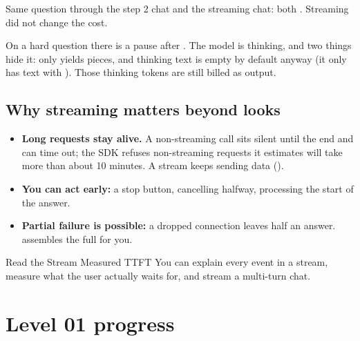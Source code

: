 \begin{lab}
Same question through the step 2 chat and the streaming chat: both . Streaming did not change the cost.
\end{lab}

\begin{trap}
On a hard question there is a pause after . The model is thinking, and two things
hide it:  only yields  pieces, and thinking text is empty by
default anyway (it only has text with ).
Those thinking tokens are still billed as output.
\end{trap}

\subsection{Why streaming matters beyond looks}

\begin{itemize}[leftmargin=1.2em,itemsep=2pt]
  \item \textbf{Long requests stay alive.} A non-streaming call sits silent until the end and can time
        out; the SDK refuses non-streaming requests it estimates will take more than about 10 minutes.
        A stream keeps sending data ().
  \item \textbf{You can act early:} a stop button, cancelling halfway, processing the start of the answer.
  \item \textbf{Partial failure is possible:} a dropped connection leaves half an answer.
         assembles the full  for you.
\end{itemize}

\begin{achievement}{Read the Stream \textperiodcentered{} Measured TTFT}
You can explain every event in a stream, measure what the user actually waits for, and stream a
multi-turn chat.
\end{achievement}

\section*{Level 01 progress}

